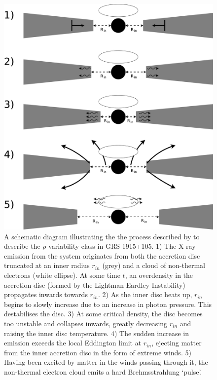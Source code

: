 \begin{figure}
  \centering
  \includegraphics[width=.9\linewidth, trim= 25mm 0mm 0mm 0mm]{images/Wind_Model1.eps}
  \caption{\small A schematic diagram illustrating the the process described by \citet{Neilsen_GRSModel} to describe the $\rho$ variability class in GRS 1915+105.  1) The X-ray emission from the system originates from both the accretion disc truncated at an inner radius $r_{in}$ (grey) and a cloud of non-thermal electrons (white ellipse).  At some time $t$, an overdensity in the accretion disc (formed by the Lightman-Eardley Instability) propagates inwards towards $r_{in}$.  2) As the inner disc heats up, $r_{in}$ begins to slowly increase due to an increase in photon pressure.  This destabilises the disc.  3) At some critical density, the disc becomes too unstable and collapses inwards, greatly decreasing $r_{in}$ and raising the inner disc temperature.  4) The sudden increase in emission exceeds the local Eddington limit at $r_{in}$, ejecting matter from the inner accretion disc in the form of extreme winds.  5) Having been excited by matter in the winds passing through it, the non-thermal electron cloud emits a hard Brehmsstrahlung `pulse'.}
  \label{fig:WindsModel}
\end{figure}

